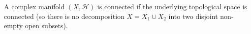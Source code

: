 A complex manifold $(X, \mathcal{H})$ is connected if the underlying topological space is connected (so there is no decomposition $X = X_1 \cup X_2$ into two disjoint non-empty open subsets).
